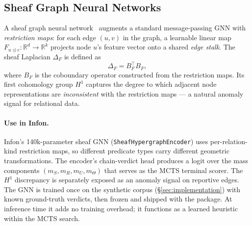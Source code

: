 \subsection{Sheaf Graph Neural Networks}
\label{sec:background:sheaf_gnn}

A sheaf graph neural network~\cite{bodnar2022sheaf} augments a standard message-passing
GNN with \emph{restriction maps}: for each edge $(u, v)$ in the graph, a
learnable linear map $F_{u \trianglelefteq e} \colon \mathbb{R}^d \to
\mathbb{R}^k$ projects node $u$'s feature vector onto a shared
\emph{edge stalk}.  The sheaf Laplacian $\Delta_F$ is defined as
\[
  \Delta_F = B_F^\top B_F,
\]
where $B_F$ is the coboundary operator constructed from the restriction maps.
Its first cohomology group $H^1$ captures the degree to which adjacent node
representations are \emph{inconsistent} with the restriction maps --- a
natural anomaly signal for relational data.

\paragraph{Use in Infon.}
Infon's 140k-parameter sheaf GNN (\texttt{SheafHypergraphEncoder}) uses
per-relation-kind restriction maps, so different predicate types carry
different geometric transformations.  The encoder's chain-verdict head
produces a logit over the mass components $(m_S, m_R, m_U, m_\Theta)$ that serves as the MCTS terminal
scorer.  The $H^1$ discrepancy is separately exposed as an anomaly signal on
reportive edges.  The GNN is trained once on the synthetic corpus
(\S\ref{sec:implementation}) with known ground-truth verdicts, then frozen and
shipped with the package.  At inference time it adds no training overhead; it
functions as a learned heuristic within the MCTS search.
